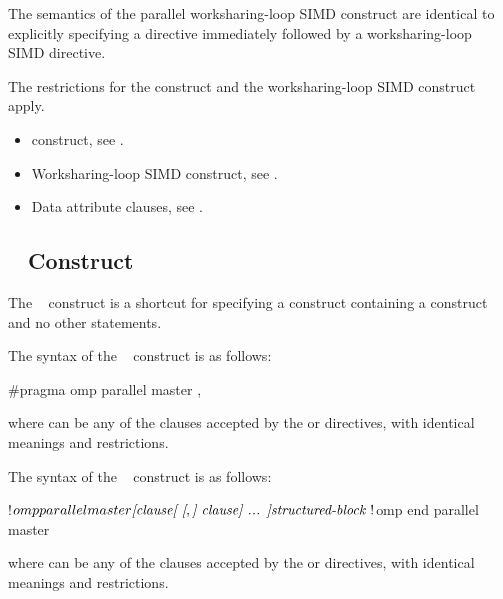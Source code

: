 \descr
The semantics of the parallel worksharing-loop SIMD construct are identical 
to explicitly specifying a  directive immediately followed by 
a worksharing-loop SIMD directive.

\restrictions
The restrictions for the  construct and the worksharing-loop 
SIMD construct apply.

\crossreferences
\begin{itemize}
\item {} construct, see
.

\item Worksharing-loop SIMD construct, see
.

\item Data attribute clauses, see
.
\end{itemize}



\subsection{~ Construct}
\label{subsec:parallel master Construct}

\summary
The ~ construct is a shortcut for specifying a 
 construct containing a  construct and no other 
statements.

\syntax
\begin{ccppspecific}
The syntax of the ~ construct is as follows:

\begin{ompcPragma}
#pragma omp parallel master \plc{[clause[ [},\plc{] clause] ... ] new-line}
\end{ompcPragma}

where  can be any of the clauses accepted by the  
or  directives, with identical meanings and restrictions.
\end{ccppspecific}

\begin{fortranspecific}
The syntax of the ~ construct is as follows:

\begin{ompfPragma}
!$omp parallel master \plc{[clause[ [},\plc{] clause] ... ]}
   \plc{structured-block }
!$omp end parallel master
\end{ompfPragma}

where  can be any of the clauses accepted by the  or
 directives, with identical meanings and restrictions.
\end{fortranspecific}

